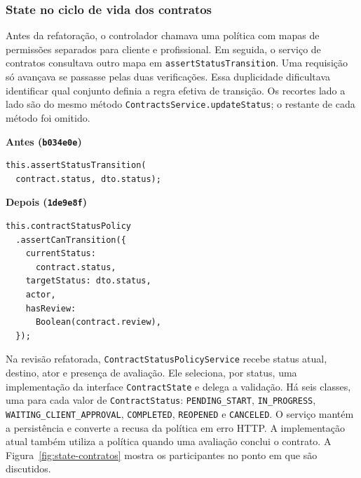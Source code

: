 \documentclass[12pt]{article}
\begin{document}
\subsubsection{State no ciclo de vida dos contratos}

Antes da refatoração, o controlador chamava uma política com mapas de permissões separados para cliente e profissional. Em seguida, o serviço de contratos consultava outro mapa em \texttt{assertStatusTransition}. Uma requisição só avançava se passasse pelas duas verificações. Essa duplicidade dificultava identificar qual conjunto definia a regra efetiva de transição. Os recortes lado a lado são do mesmo método \texttt{ContractsService.updateStatus}; o restante de cada método foi omitido.

\noindent
\begin{minipage}[t]{0.48\linewidth}
  \vspace{0pt}\textbf{Antes (\texttt{b034e0e})}\par
  \footnotesize
\begin{verbatim}
this.assertStatusTransition(
  contract.status, dto.status);
\end{verbatim}
\end{minipage}\hfill
\begin{minipage}[t]{0.48\linewidth}
  \vspace{0pt}\textbf{Depois (\texttt{1de9e8f})}\par
  \footnotesize
\begin{verbatim}
this.contractStatusPolicy
  .assertCanTransition({
    currentStatus:
      contract.status,
    targetStatus: dto.status,
    actor,
    hasReview:
      Boolean(contract.review),
  });
\end{verbatim}
\end{minipage}

Na revisão refatorada, \texttt{ContractStatusPolicyService} recebe status atual, destino, ator e presença de avaliação. Ele seleciona, por status, uma implementação da interface \texttt{ContractState} e delega a validação. Há seis classes, uma para cada valor de \texttt{ContractStatus}: \texttt{PENDING\_START}, \texttt{IN\_PROGRESS}, \texttt{WAITING\_CLIENT\_APPROVAL}, \texttt{COMPLETED}, \texttt{REOPENED} e \texttt{CANCELED}. O serviço mantém a persistência e converte a recusa da política em erro HTTP. A implementação atual também utiliza a política quando uma avaliação conclui o contrato. A Figura~\ref{fig:state-contratos} mostra os participantes no ponto em que são discutidos.
\end{document}
